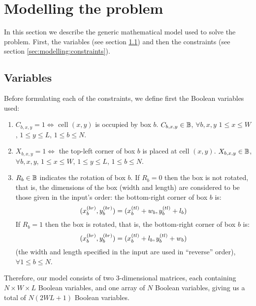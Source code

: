 \section{Modelling the problem}
\label{sec:modelling}

In this section we describe the generic mathematical model used to solve the problem.
First, the variables (see section \ref{sec:modelling:variables}) and then the 
constraints (see section \ref{sec:modelling:constraints}).

\subsection{Variables}
\label{sec:modelling:variables}

Before formulating each of the constraints, we define first the Boolean variables used:

\begin{enumerate}
    \item \label{var:box-cell} $C_{b,x,y} = 1 \Longleftrightarrow$ cell $(x,y)$ is occupied
    by box $b$. $C_{b,x,y} \in \mathbb{B}$, $\forall b,x,y$ $1 \le x \le W$, $1 \le y \le L$,
    $1 \le b \le N$.
    
    \item \label{var:box-corner} $X_{b,x,y} = 1 \Longleftrightarrow$ the top-left corner of
    box $b$ is placed at cell $(x,y)$. $X_{b,x,y} \in \mathbb{B}$, $\forall b,x,y$,
    $1 \le x \le W$, $1 \le y \le L$, $1 \le b \le N$.
    
    \item \label{var:box-rotated} $R_b \in \mathbb{B}$ indicates the rotation of box $b$. If
    $R_b = 0$ then the box is not rotated, that is, the dimensions of the box (width and
    length) are considered to be those given in the input's order: the bottom-right corner
    of box $b$ is:
    \begin{equation}
    \label{eq:box-rotation-0}
    (\Xbr, \Ybr) = (\Xtl + w_b, \Ytl + l_b)
    \end{equation}
    If $R_b = 1$ then the box is rotated, that is, the bottom-right corner of box $b$ is:
    \begin{equation}
    \label{eq:box-rotation-1}
    (\Xbr, \Ybr) = (\Xtl + l_b, \Ytl + w_b)
    \end{equation}
    (the width and length specified in the input are used in ``reverse'' order), 
    $\forall 1 \le b \le N$.
\end{enumerate}

Therefore, our model consists of two 3-dimensional matrices, each containing
$N \times W \times L$ Boolean variables, and one array of $N$ Boolean variables, giving
us a total of $N(2WL + 1)$ Boolean variables.

